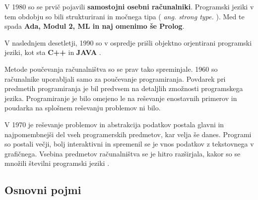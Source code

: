 V 1980 so se prvič pojavili \textbf{samostojni osebni računalniki}. Programski
jeziki v tem obdobju so bili strukturirani in močnega tipa (
\emph{ang.  strong type.} ). Med te spada \textbf{Ada, Modul 2, ML in
  naj omenimo še Prolog}.

V naslednjem desetletji, 1990 so v ospredje prišli objektno
orjentirani programski jeziki, kot sta \textbf{C++} in \textbf{JAVA}
\cite{thesisAWebP}.



Metode poučevanja računalništva so se prav tako spreminjale. 1960 so
računalnike uporabljali samo za poučevanje programiranja. Povdarek pri
predmetih programiranja je bil predvsem na detaljlih zmožnosti
programskega jezika. Programiranje je bilo omejeno le na reševanje
enostavnih primerov in poudarka na splošnem reševanju problemov ni
bilo.

V 1970 je reševanje problemov in abstrakcija podatkov postala glavni
in najpomembnejši del vseh programerskih predmetov, kar velja še
danes. Programi so postali večji, bolj interaktivni in spremenil se
je vnos podatkov z tekstovnega v grafičnega. Vsebina predmetov
računalništva se je hitro razširjala, kakor so se množili številni
programski jeziki \cite{thesisAWebP}.




 
\subsection{Osnovni pojmi}
\label{sec:kaj_je_programiranje}



